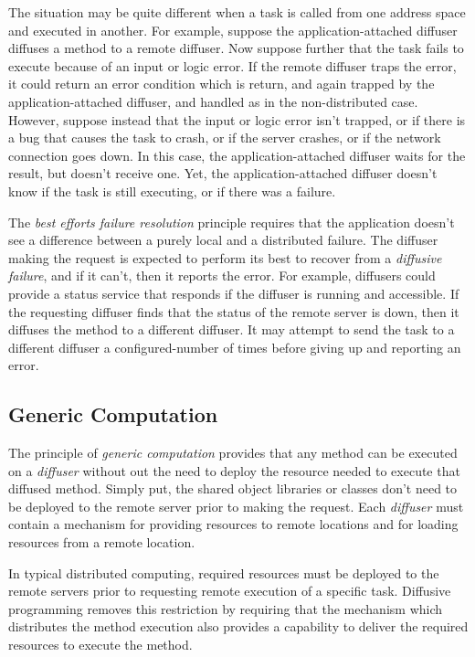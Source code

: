 \documentclass[11pt]{article}
\begin{document}
The situation may be quite different when a task is called from one address space and executed in another. For example, suppose the application-attached diffuser diffuses a method to a remote diffuser. Now suppose further that the task fails to execute because of an input or logic error. If the remote diffuser traps the error, it could return an error condition which is return, and again trapped by the application-attached diffuser, and handled as in the non-distributed case. However, suppose instead that the input or logic error isn't trapped, or if there is a bug that causes the task to crash, or if the server crashes, or if the network connection goes down. In this case, the application-attached diffuser waits for the result, but doesn't receive one. Yet, the application-attached diffuser doesn't know if the task is still executing, or if there was a failure.

The \emph{best efforts failure resolution} principle requires that the application doesn't see a difference between a purely local and a distributed failure. The diffuser making the request is expected to perform its best to recover from a \emph{diffusive failure}, and if it can't, then it reports the error. For example, diffusers could provide a status service that responds if the diffuser is running and accessible. If the requesting diffuser finds that the status of the remote server is down, then it diffuses the method to a different diffuser. It may attempt to send the task to a different diffuser a configured-number of times before giving up and reporting an error.

\subsection{Generic Computation\label{sec:generic_computation}}
The principle of \emph{generic computation} provides that any method can be executed on a \emph{diffuser} without out the need to deploy the resource needed to execute that diffused method. Simply put, the shared object libraries or classes don't need to be deployed to the remote server prior to making the request. Each \emph{diffuser} must contain a mechanism for providing resources to remote locations and for loading resources from a remote location.

In typical distributed computing, required resources must be deployed to the remote servers prior to requesting remote execution of a specific task. Diffusive programming removes this restriction by requiring that the mechanism which distributes the method execution also provides a capability to deliver the required resources to execute the method. 
\end{document}
